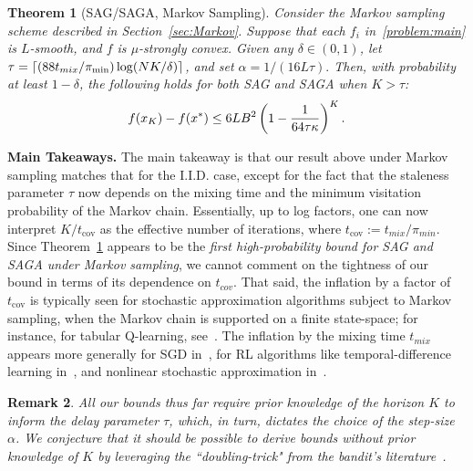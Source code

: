 \documentclass{article}
\theoremstyle{plain}
\newtheorem{theorem}{Theorem}[section]
\theoremstyle{definition}
\newtheorem{remark}[theorem]{Remark}
\newcommand{\paren}[1]{\left( #1\right)}
\DeclarePairedDelimiter{\ceil}{\lceil}{\rceil}
\begin{document}
\begin{theorem}[SAG/SAGA, Markov Sampling]\label{thm:sc_markov} Consider the Markov sampling scheme described in Section~\ref{sec:Markov}. Suppose that each $f_i$ in~\eqref{problem:main} is $L$-smooth, and $f$ is $\mu$-strongly convex. Given any $\delta \in (0,1)$, let $\tau= \ceil{(88t_{mix}/\pi_{\min})\log (NK/\delta)}$, and set $\alpha = 1/(16 L \tau).$ Then, with probability at least $1-\delta$, the following holds for both SAG and SAGA when $K > \tau$: 
\begin{equation}
    f(x_K) - f(x^*)\leq 6LB^2\paren{1-\frac{1}{64\tau\kappa}}^{K}.
\vspace{-1mm}
\end{equation}
\end{theorem}
\vspace{-1mm}
\textbf{Main Takeaways.} The main takeaway is that our result above under Markov sampling matches that for the I.I.D. case, except for the fact that the staleness parameter $\tau$ now depends on the mixing time and the minimum visitation probability of the Markov chain. Essentially, up to log factors, one can now interpret $K/t_{\textrm{cov}}$ as the effective number of iterations, where $t_{\textrm{cov}} := t_{mix}/\pi_{min}$. Since Theorem~\ref{thm:sc_markov} appears to be the \emph{first high-probability bound for SAG and SAGA under Markov sampling}, we cannot comment on the tightness of our bound in terms of its dependence on $t_{cov}.$ That said, the inflation by a factor of $t_{\textrm{cov}}$ is typically seen for stochastic approximation algorithms subject to Markov sampling, when the Markov chain is supported on a finite state-space; for instance, for tabular Q-learning, see~\citet{qu}. The inflation by the mixing time $t_{mix}$ appears more generally for SGD in~\citet{nagaraj2020least}, for RL algorithms like temporal-difference learning in~\citet{bhandari_finite, srikant, mitra2024simple}, and nonlinear stochastic approximation in~\citet{chen2022finite}. 

\begin{remark}
\emph{All our bounds thus far require prior knowledge of the horizon $K$ to inform the delay parameter $\tau$, which, in turn, dictates the choice of the step-size $\alpha$. We conjecture that it should be possible to derive bounds without prior knowledge of $K$ by leveraging the ``doubling-trick" from the bandit's literature~\cite{lattimore2020bandit}.} 

\end{remark}
\end{document}
